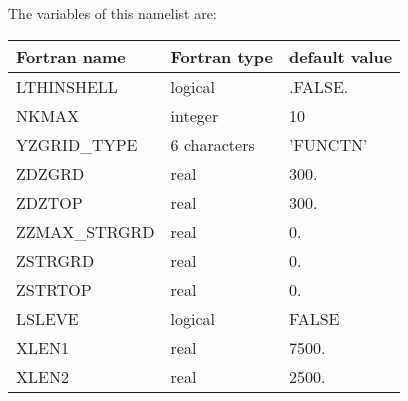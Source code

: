 The variables of this namelist are:

\begin{center}
\begin{tabular} {|l|l|l|}
\hline
Fortran name & Fortran type & default value\\
\hline
\hline
LTHINSHELL     & logical    & .FALSE.    \\
NKMAX          & integer    & 10         \\
YZGRID\_TYPE   & 6 characters & 'FUNCTN' \\
ZDZGRD         & real & 300.  \\
ZDZTOP         & real & 300.  \\
ZZMAX\_STRGRD  & real & 0.    \\
ZSTRGRD        & real & 0.    \\
ZSTRTOP        & real & 0.    \\
LSLEVE         & logical & FALSE   \\
XLEN1          & real & 7500.   \\
XLEN2          & real & 2500.   \\
\hline
\end{tabular}
\end{center}

